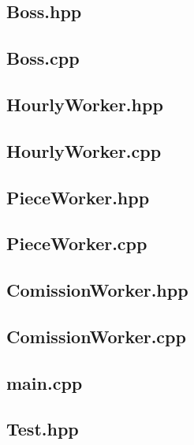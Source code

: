 \documentclass[12pt,naustrian,a4widepaper]{scrartcl}
\begin{document}
\begin{landscape}
	\clearpage
	\subsection{Boss.hpp}
	
	\clearpage
	\subsection{Boss.cpp}
	
	
	\clearpage
	\subsection{HourlyWorker.hpp}
	
	\clearpage
	\subsection{HourlyWorker.cpp}
	
	
	\clearpage
	\subsection{PieceWorker.hpp}
	
	\clearpage
	\subsection{PieceWorker.cpp}
	
	
	\clearpage
	\subsection{ComissionWorker.hpp}
	
	\clearpage
	\subsection{ComissionWorker.cpp}
	
	
	\clearpage
	\subsection{main.cpp}
	
	\clearpage
	\subsection{Test.hpp}
	
\end{landscape}
\restoregeometry
	
	
\end{document}
